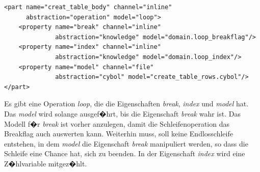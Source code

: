 \begin{verbatim}      
<part name="creat_table_body" channel="inline" 
      abstraction="operation" model="loop">
    <property name="break" channel="inline" 
              abstraction="knowledge" model="domain.loop_breakflag"/>
    <property name="index" channel="inline" 
              abstraction="knowledge" model="domain.loop_index"/>
    <property name="model" channel="file" 
              abstraction="cybol" model="create_table_rows.cybol"/>
</part>
\end{verbatim}      
      Es gibt eine Operation \emph{loop}, die die Eigenschaften \emph{break}, \emph{index}
      und \emph{model} hat. 
      Das \emph{model} wird solange ausgef�hrt,
      bis die Eigenschaft \emph{break} wahr ist. Das Modell f�r \emph{break} 
      ist vorher anzulegen, damit die Schleifenoperation das Breakflag auch auswerten kann.
      Weiterhin muss, soll keine Endlosschleife entstehen,  
      in dem \emph{model} die Eigenschaft \emph{break} manipuliert werden, so dass die Schleife
      eine Chance hat, sich zu beenden. In der Eigenschaft \emph{index}
      wird eine Z�hlvariable mitgez�hlt.
 